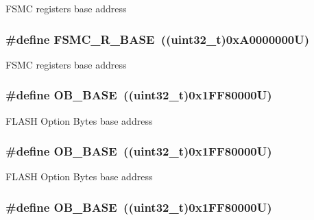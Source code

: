 F\-S\-M\-C registers base address \hypertarget{group___peripheral__memory__map_gaddf0e199dccba83272b20c9fb4d3aaed}{
\subsubsection[{F\-S\-M\-C\-\_\-\-R\-\_\-\-B\-A\-S\-E}]{\setlength{\rightskip}{0pt plus 5cm}\#define F\-S\-M\-C\-\_\-\-R\-\_\-\-B\-A\-S\-E~((uint32\-\_\-t)0x\-A0000000\-U)}}\label{group___peripheral__memory__map_gaddf0e199dccba83272b20c9fb4d3aaed}
F\-S\-M\-C registers base address \hypertarget{group___peripheral__memory__map_gab5b5fb155f9ee15dfb6d757da1adc926}{
\subsubsection[{O\-B\-\_\-\-B\-A\-S\-E}]{\setlength{\rightskip}{0pt plus 5cm}\#define O\-B\-\_\-\-B\-A\-S\-E~((uint32\-\_\-t)0x1\-F\-F80000\-U)}}\label{group___peripheral__memory__map_gab5b5fb155f9ee15dfb6d757da1adc926}
F\-L\-A\-S\-H Option Bytes base address \hypertarget{group___peripheral__memory__map_gab5b5fb155f9ee15dfb6d757da1adc926}{
\subsubsection[{O\-B\-\_\-\-B\-A\-S\-E}]{\setlength{\rightskip}{0pt plus 5cm}\#define O\-B\-\_\-\-B\-A\-S\-E~((uint32\-\_\-t)0x1\-F\-F80000\-U)}}\label{group___peripheral__memory__map_gab5b5fb155f9ee15dfb6d757da1adc926}
F\-L\-A\-S\-H Option Bytes base address \hypertarget{group___peripheral__memory__map_gab5b5fb155f9ee15dfb6d757da1adc926}{
\subsubsection[{O\-B\-\_\-\-B\-A\-S\-E}]{\setlength{\rightskip}{0pt plus 5cm}\#define O\-B\-\_\-\-B\-A\-S\-E~((uint32\-\_\-t)0x1\-F\-F80000\-U)}}\label{group___peripheral__memory__map_gab5b5fb155f9ee15dfb6d757da1adc926}
